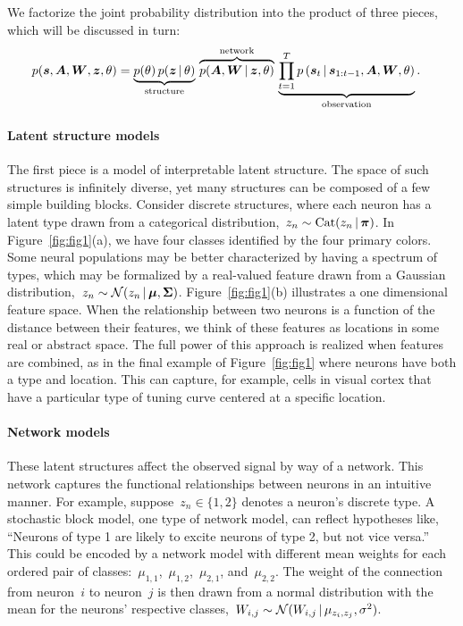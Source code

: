 We factorize the joint probability
distribution into the product of three pieces, which will be discussed
in turn:
\begin{align}
p(\boldsymbol{s}, \boldsymbol{A}, \boldsymbol{W}, \boldsymbol{z}, \theta) 
&= 
\underbrace{p(\theta) \, p(\boldsymbol{z} \,|\, \theta)}_\text{structure} \, 
\overbrace{p(\boldsymbol{A}, \boldsymbol{W} \,|\, \boldsymbol{z}, \theta)}^\text{network} \, 
\underbrace{ \prod_{t=1}^T p \left(\boldsymbol{s}_t \,|\, \boldsymbol{s}_{1:t-1}, \boldsymbol{A}, \boldsymbol{W}, \theta \right)}_\text{observation}.
\end{align}

\paragraph{Latent structure models}
The first piece is a model of interpretable latent structure. 
The space of such structures is infinitely diverse, yet many structures can be composed of a few simple building blocks.
Consider discrete structures, where each neuron has a latent type drawn from a categorical distribution,~$z_n \sim \mathrm{Cat}(z_n \,|\, \boldsymbol{\pi})$. 
In Figure~\ref{fig:fig1}(a), we have four classes identified by the four primary colors.
Some neural populations may be better characterized by having a spectrum of types, which may be formalized by a real-valued feature drawn from a Gaussian distribution,~$z_n \sim \mathcal{N}(z_n \,|\, \boldsymbol{\mu}, \boldsymbol{\Sigma})$. 
Figure~\ref{fig:fig1}(b) illustrates a one dimensional feature space.
When the relationship between two neurons is a function of the distance between their features, we think of these features as locations in some real or abstract space. 
The full power of this approach is realized when features are combined, as in the final example of Figure~\ref{fig:fig1} where neurons have both a type and location. 
This can capture, for example, cells in visual cortex that have a particular type of tuning curve centered at a specific location. 

\paragraph{Network models}
These latent structures affect the observed signal by way of a network. 
This network captures the functional relationships between neurons in an intuitive manner.
For example, suppose~${z_n \in \{1, 2\}}$ denotes a neuron's discrete type. 
A stochastic block model, one type of network model, can reflect hypotheses like, ``Neurons of type 1 are likely to excite neurons of type 2, but not vice versa.''  
This could be encoded by a network model with different mean weights for each ordered pair of classes:~$\mu_{1,1}$,~$\mu_{1,2}$,~$\mu_{2,1}$, and~$\mu_{2,2}$.
The weight of the connection from neuron~$i$ to neuron~$j$ is then drawn from a normal distribution with the mean for the neurons' respective classes,~$W_{i,j} \sim \mathcal{N}(W_{i,j} \,|\, \mu_{z_i, z_j}, \sigma^2)$. 

